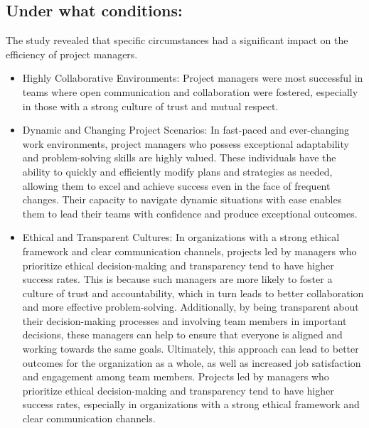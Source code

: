 \documentclass{article}
\begin{document}
\subsection{Under what conditions:}
The study revealed that specific circumstances had a significant impact on the efficiency of project managers.
\begin{itemize}
    \item Highly Collaborative Environments: Project managers were most successful in teams where open communication and collaboration were fostered, especially in those with a strong culture of trust and mutual respect.
    \item Dynamic and Changing Project Scenarios: In fast-paced and ever-changing work environments, project managers who possess exceptional adaptability and problem-solving skills are highly valued. These individuals have the ability to quickly and efficiently modify plans and strategies as needed, allowing them to excel and achieve success even in the face of frequent changes. Their capacity to navigate dynamic situations with ease enables them to lead their teams with confidence and produce exceptional outcomes\cite{relationship_between_project_manage}.
    \item Ethical and Transparent Cultures: In organizations with a strong ethical framework and clear communication channels, projects led by managers who prioritize ethical decision-making and transparency tend to have higher success rates. This is because such managers are more likely to foster a culture of trust and accountability, which in turn leads to better collaboration and more effective problem-solving. Additionally, by being transparent about their decision-making processes and involving team members in important decisions, these managers can help to ensure that everyone is aligned and working towards the same goals. Ultimately, this approach can lead to better outcomes for the organization as a whole, as well as increased job satisfaction and engagement among team members. Projects led by managers who prioritize ethical decision-making and transparency tend to have higher success rates, especially in organizations with a strong ethical framework and clear communication channels\cite{Project_Management_Techniques}.
\end{itemize}
\end{document}
